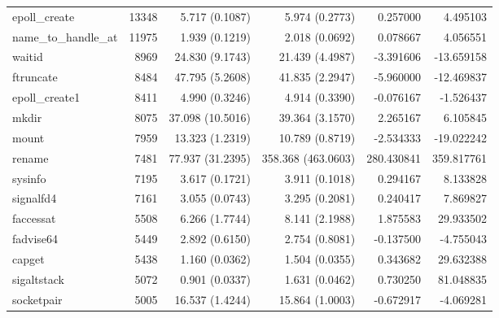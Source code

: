 \begin{longtable}{>{\ttfamily}lrrrrr}
                  epoll\_create &      13348 &           5.717 (0.1087) &           5.974 (0.2773) &        0.257000 &     4.495103 \\
           name\_to\_handle\_at &      11975 &           1.939 (0.1219) &           2.018 (0.0692) &        0.078667 &     4.056551 \\
                         waitid &       8969 &          24.830 (9.1743) &          21.439 (4.4987) &       -3.391606 &   -13.659158 \\
                      ftruncate &       8484 &          47.795 (5.2608) &          41.835 (2.2947) &       -5.960000 &   -12.469837 \\
                 epoll\_create1 &       8411 &           4.990 (0.3246) &           4.914 (0.3390) &       -0.076167 &    -1.526437 \\
                          mkdir &       8075 &         37.098 (10.5016) &          39.364 (3.1570) &        2.265167 &     6.105845 \\
                          mount &       7959 &          13.323 (1.2319) &          10.789 (0.8719) &       -2.534333 &   -19.022242 \\
                         rename &       7481 &         77.937 (31.2395) &       358.368 (463.0603) &      280.430841 &   359.817761 \\
                        sysinfo &       7195 &           3.617 (0.1721) &           3.911 (0.1018) &        0.294167 &     8.133828 \\
                      signalfd4 &       7161 &           3.055 (0.0743) &           3.295 (0.2081) &        0.240417 &     7.869827 \\
                      faccessat &       5508 &           6.266 (1.7744) &           8.141 (2.1988) &        1.875583 &    29.933502 \\
                      fadvise64 &       5449 &           2.892 (0.6150) &           2.754 (0.8081) &       -0.137500 &    -4.755043 \\
                         capget &       5438 &           1.160 (0.0362) &           1.504 (0.0355) &        0.343682 &    29.632388 \\
                    sigaltstack &       5072 &           0.901 (0.0337) &           1.631 (0.0462) &        0.730250 &    81.048835 \\
                     socketpair &       5005 &          16.537 (1.4244) &          15.864 (1.0003) &       -0.672917 &    -4.069281 \\

\end{longtable}
